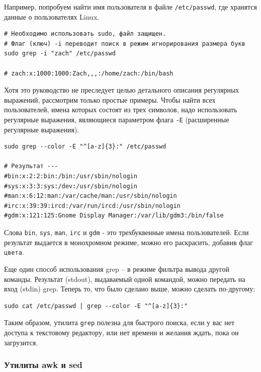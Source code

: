 \documentclass[12pt]{article}
\begin{document}
Например, попробуем найти имя пользователя в файле \texttt{/etc/passwd},
где хранятся данные о пользователях Linux.

\begin{verbatim}
# Необходимо использовать sudo, файл защищен.
# Флаг (ключ) -i переводит поиск в режим игнорирования размера букв
sudo grep -i "zach" /etc/passwd

# zach:x:1000:1000:Zach,,,:/home/zach:/bin/bash
\end{verbatim}

Хотя это руководство не преследует целью детального описания регулярных
выражений, рассмотрим только простые примеры. Чтобы найти всех
пользователей, имена которых состоят из трех символов, надо использовать регулярные выражения,
являющиеся параметром флага \texttt{-E} (расширенные регулярные выражения).

\begin{verbatim}
sudo grep --color -E "^[a-z]{3}:" /etc/passwd

# Результат ---
#bin:x:2:2:bin:/bin:/usr/sbin/nologin
#sys:x:3:3:sys:/dev:/usr/sbin/nologin
#man:x:6:12:man:/var/cache/man:/usr/sbin/nologin
#irc:x:39:39:ircd:/var/run/ircd:/usr/sbin/nologin
#gdm:x:121:125:Gnome Display Manager:/var/lib/gdm3:/bin/false
\end{verbatim}

Слова \texttt{bin}, \texttt{sys}, \texttt{man}, \texttt{irc} и \texttt{gdm} - это трехбуквенные имена пользователей. Если результат выдается в монохромном
режиме, можно его раскрасить, добавив флаг \texttt{цвета}.

Еще один способ использования grep -- в режиме фильтра вывода другой
команды. Результат (stdout), выдаваемый одной командой, можно передать
на вход (stdin) grep. Теперь то, что было сделано выше, можно сделать
по-другому:

\begin{verbatim}
sudo cat /etc/passwd | grep --color -E "^[a-z]{3}:"
\end{verbatim}

Таким образом, утилита \texttt{grep} полезна для быстрого поиска, если у
вас нет доступа к текстовому редактору, или нет времени и
желания ждать, пока он загрузится.

\hypertarget{awk-and-sed}{%
\subsubsection{\texorpdfstring{\protect\hyperlink{awk-and-sed}{}Утилиты
awk и sed}{Утилиты awk и sed}}\label{awk-and-sed}}
\end{document}
